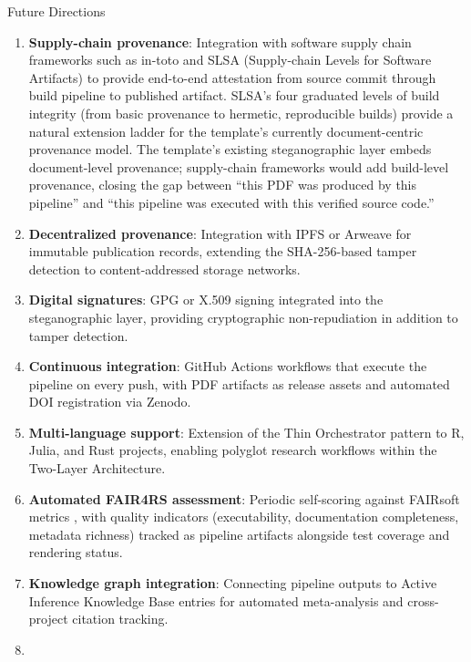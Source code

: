 \documentclass[
  ignorenonframetext,
]{beamer}
\author{\texorpdfstring{}{}}
\date{}
\providecommand{\tightlist}{%
  \setlength{\itemsep}{0pt}\setlength{\parskip}{0pt}}
\begin{document}
\begin{frame}{Future Directions}
\protect{}\label{future-directions}
\begin{enumerate}
\tightlist
\item
  \textbf{Supply-chain provenance}: Integration with software supply
  chain frameworks such as in-toto  and SLSA
  (Supply-chain Levels for Software Artifacts)  to
  provide end-to-end attestation from source commit through build
  pipeline to published artifact. SLSA's four graduated levels of build
  integrity (from basic provenance to hermetic, reproducible builds)
  provide a natural extension ladder for the template's currently
  document-centric provenance model. The template's existing
  steganographic layer embeds document-level provenance; supply-chain
  frameworks would add build-level provenance, closing the gap between
  ``this PDF was produced by this pipeline'' and ``this pipeline was
  executed with this verified source code.''
\item
  \textbf{Decentralized provenance}: Integration with IPFS or Arweave
  for immutable publication records, extending the SHA-256-based tamper
  detection to content-addressed storage networks.
\item
  \textbf{Digital signatures}: GPG or X.509 signing integrated into the
  steganographic layer, providing cryptographic non-repudiation in
  addition to tamper detection.
\item
  \textbf{Continuous integration}: GitHub Actions workflows that execute
  the pipeline on every push, with PDF artifacts as release assets and
  automated DOI registration via Zenodo.
\item
  \textbf{Multi-language support}: Extension of the Thin Orchestrator
  pattern to R, Julia, and Rust projects, enabling polyglot research
  workflows within the Two-Layer Architecture.
\item
  \textbf{Automated FAIR4RS assessment}: Periodic self-scoring against
  FAIRsoft metrics , with quality indicators
  (executability, documentation completeness, metadata richness) tracked
  as pipeline artifacts alongside test coverage and rendering status.
\item
  \textbf{Knowledge graph integration}: Connecting pipeline outputs to
  Active Inference Knowledge Base entries for automated meta-analysis
  and cross-project citation tracking.
\item

\end{enumerate}
\end{frame}
\end{document}
